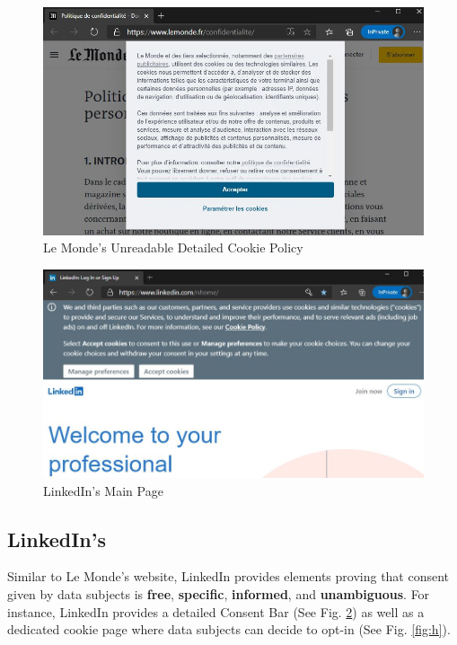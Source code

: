 \documentclass[twocolumn, letterpaper]{scrartcl}
\begin{document}
        \begin{figure}[tbp]	
            \includegraphics[width=0.95\linewidth]{lm_policy.JPG}
            \caption{Le Monde's Unreadable Detailed Cookie Policy\label{fig:f}}
        \end{figure}
        
        \begin{figure}[tbp]	
        \includegraphics[width=0.95\linewidth]{ld_website.JPG}
        \caption{LinkedIn's Main Page \label{fig:g}}
        \end{figure}
        
	\subsection*{LinkedIn's}
	    
	    Similar to Le Monde's website, LinkedIn provides elements proving that consent given by data subjects is \textbf{free}, \textbf{specific}, \textbf{informed}, and \textbf{unambiguous}. For instance, LinkedIn provides a detailed Consent Bar (See Fig. \ref{fig:g}) as well as a dedicated cookie page where data subjects can decide to opt-in (See Fig. \ref{fig:h}).
        
\end{document}
